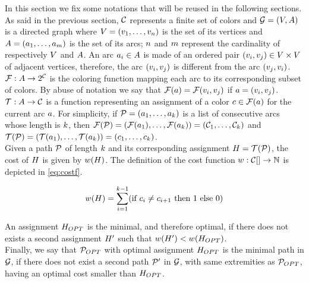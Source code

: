 In this section we fix some notations that will be reused in the following sections.\\
As said in the previous section, $\mathcal{C}$ represents a finite set of colors and $\mathcal{G} = (V, A)$ is a directed graph where $V = (v_1,\ldots,v_{n})$ is the set of its vertices and $A = (a_1,\ldots,a_{m})$ is the set of its arcs; $n$ and $m$ represent the cardinality of respectively $V$ and $A$. An arc $a_i \in A$ is made of an ordered pair $(v_i, v_j) \in V \times V$ of adjacent vertices, therefore, the arc $(v_i, v_j)$ is different from the arc $(v_j, v_i)$.\\
$\mathcal{F} : A \rightarrow 2^{\mathcal{C}}$ is the coloring function mapping each arc to its corresponding subset of colors. By abuse of notation we say that $\mathcal{F}(a) = \mathcal{F}(v_i, v_j)$ if $a = (v_i, v_j)$.\\
$\mathcal{T}: A \rightarrow \mathcal{C}$ is a function representing an assignment of a color $c \in \mathcal{F}(a)$ for the current arc $a$. For simplicity, if $\mathcal{P} = (a_1,\ldots,a_{k})$ is a list of consecutive arcs whose length is $k$, then $\mathcal{F}(\mathcal{P}) = (\mathcal{F}(a_1), \dots, \mathcal{F}(a_k)) = (\mathcal{C}_1,\ldots,\mathcal{C}_{k})$ and $\mathcal{T}(\mathcal{P}) = (\mathcal{T}(a_1), \dots, \mathcal{T}(a_k))  = (c_1,\ldots,c_{k})$.\\
Given a path $\mathcal{P}$ of length $k$ and its corresponding assignment $H = \mathcal{T}(\mathcal{P})$, the cost of $H$ is given by $w(H)$. The definition of the cost function $w : \mathcal{C}[] \rightarrow \mathbb{N}$ is depicted in \cref{eq:costf}.

\begin{equation}
	\label{eq:costf}
	w(H) = \sum\limits_{i = 1}^{k-1} (\text{if } c_i \neq c_{i+1} \text{ then } 1 \text{ else } 0)
\end{equation}

An assignment $H_{OPT}$ is the minimal, and therefore optimal, if there does not exists a second assignment $H'$ such that $w(H') < w(H_{OPT})$.\\
Finally, we say that $\mathcal{P}_{OPT}$ with optimal assignment $H_{OPT}$ is the minimal path in $\mathcal{G}$, if there does not exist a second path $\mathcal{P}'$ in $\mathcal{G}$, with same extremities as $\mathcal{P}_{OPT}$, having an optimal cost smaller than $H_{OPT}$.
